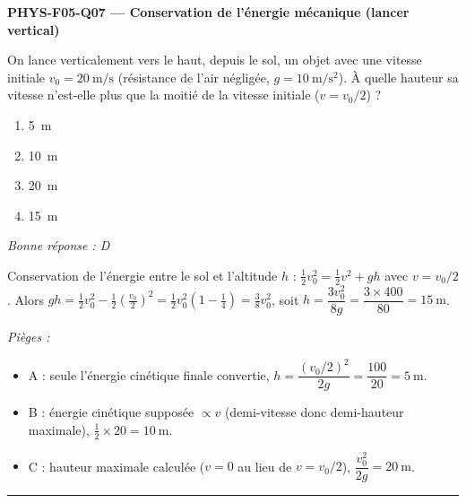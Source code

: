 \documentclass[11pt,a4paper]{article}
\newcommand{\vv}[1]{\vec{#1}}\newcommand{\ds}{\displaystyle}
\begin{document}
\noindent\textbf{PHYS-F05-Q07 --- Conservation de l'énergie mécanique (lancer vertical)}\par
On lance verticalement vers le haut, depuis le sol, un objet avec une vitesse initiale
$v_0=\qty{20}{\metre\per\second}$ (résistance de l'air négligée, $g=\qty{10}{\metre\per\second\squared}$).
À quelle hauteur sa vitesse n'est-elle plus que la moitié de la vitesse initiale ($v=v_0/2$) ?
\begin{center}
\end{center}
\begin{enumerate}[label=\Alph*)]
\item \qty{5}{\metre}
\item \qty{10}{\metre}
\item \qty{20}{\metre}
\item \qty{15}{\metre}
\end{enumerate}
\textit{Bonne réponse : D}\par
Conservation de l'énergie entre le sol et l'altitude $h$ : $\tfrac12 v_0^2=\tfrac12 v^2+gh$ avec
$v=v_0/2$. Alors $gh=\tfrac12 v_0^2-\tfrac12\left(\tfrac{v_0}{2}\right)^2=\tfrac12 v_0^2\left(1-\tfrac14\right)=\tfrac38 v_0^2$,
soit $h=\dfrac{3v_0^2}{8g}=\dfrac{3\times400}{80}=\qty{15}{\metre}$.\par
\textit{Pièges :}
\begin{itemize}
\item A : seule l'énergie cinétique finale convertie, $h=\dfrac{(v_0/2)^2}{2g}=\dfrac{100}{20}=\qty{5}{\metre}$.
\item B : énergie cinétique supposée $\propto v$ (demi-vitesse donc demi-hauteur maximale), $\tfrac12\times20=\qty{10}{\metre}$.
\item C : hauteur maximale calculée ($v=0$ au lieu de $v=v_0/2$), $\dfrac{v_0^2}{2g}=\qty{20}{\metre}$.
\end{itemize}
\vspace{8pt}\hrule\vspace{8pt}
\end{document}

